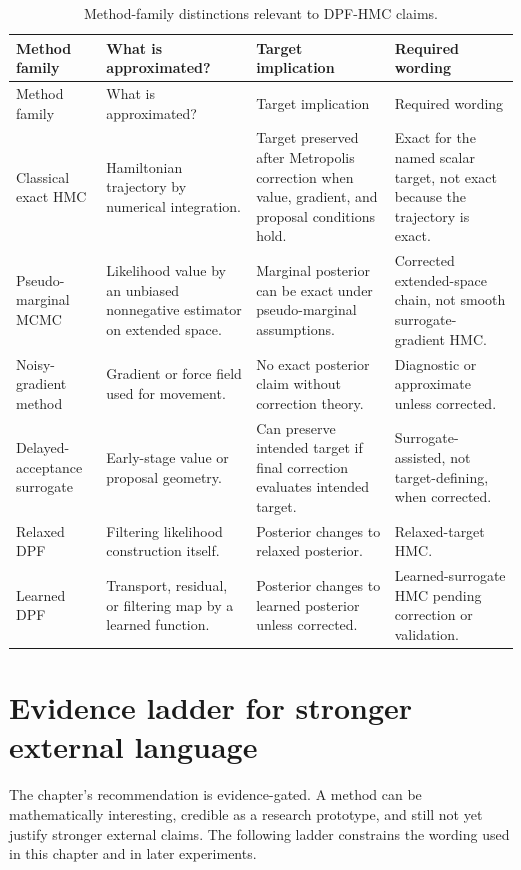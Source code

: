 \begin{longtable}{@{}p{} p{} p{} p{}@{}}
\caption{Method-family distinctions relevant to DPF-HMC claims.}
\label{tab:bf-dpf-hmc-family-comparison}\\
\toprule
Method family & What is approximated? & Target implication & Required wording \\
\midrule
\endfirsthead
\toprule
Method family & What is approximated? & Target implication & Required wording \\
\midrule
\endhead
Classical exact HMC &
Hamiltonian trajectory by numerical integration. &
Target preserved after Metropolis correction when value, gradient, and proposal
conditions hold. &
Exact for the named scalar target, not exact because the trajectory is exact. \\
Pseudo-marginal MCMC &
Likelihood value by an unbiased nonnegative estimator on extended space. &
Marginal posterior can be exact under pseudo-marginal assumptions. &
Corrected extended-space chain, not smooth surrogate-gradient HMC. \\
Noisy-gradient method &
Gradient or force field used for movement. &
No exact posterior claim without correction theory. &
Diagnostic or approximate unless corrected. \\
Delayed-acceptance surrogate &
Early-stage value or proposal geometry. &
Can preserve intended target if final correction evaluates intended target. &
Surrogate-assisted, not target-defining, when corrected. \\
Relaxed DPF &
Filtering likelihood construction itself. &
Posterior changes to relaxed posterior. &
Relaxed-target HMC. \\
Learned DPF &
Transport, residual, or filtering map by a learned function. &
Posterior changes to learned posterior unless corrected. &
Learned-surrogate HMC pending correction or validation. \\
\bottomrule
\end{longtable}

\section{Evidence ladder for stronger external language}
\label{sec:bf-dpf-hmc-banking-gates}

The chapter's recommendation is evidence-gated.  A method can be mathematically
interesting, credible as a research prototype, and still not yet justify
stronger external claims.  The following ladder constrains the wording used in
this chapter and in later experiments.

